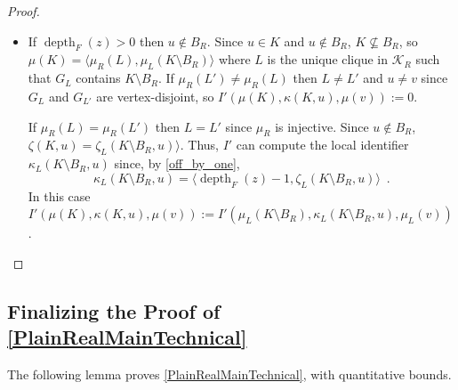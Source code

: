 \documentclass{patmorin}
\let\eqref\cref
\newcommand{\vida}[1]{\noindent{\color{pink} VD: #1}}
\newcommand{\gwen}[1]{\noindent\textcolor{Purple}{GJ: #1}}
\newcommand{\piotr}[1]{\noindent\textcolor{red}{PiMi: #1}}
\DeclareMathOperator{\depth}{depth}
\newcommand{\calK}{\mathcal{K}}
\begin{document}
\begin{proof}
\begin{itemize}
\begin{itemize}
        \item If $\depth_F(z)>0$ then $u\not\in B_R$.  Since $u\in K$ and $u\not\in B_R$, $K\not\subseteq B_R$, so $\mu(K)=\langle \mu_R(L),\mu_{L}(K\setminus B_R)\rangle$ where $L$ is the unique clique in $\calK_R$ such that $G_L$ contains $K\setminus B_R$.  If $\mu_R(L')\neq \mu_R(L)$ then $L\neq L'$ and $u\neq v$ since $G_{L}$ and $G_{L'}$ are vertex-disjoint, so $I'(\mu(K),\kappa(K,u),\mu(v)):=0$.

        If $\mu_R(L)=\mu_R(L')$ then $L=L'$ since $\mu_R$ is injective.
        Since $u\not\in B_R$,  $\zeta(K,u)=\zeta_L(K\setminus B_R,u)\rangle$.
        Thus, $I'$ can compute the local identifier $\kappa_L(K\setminus B_R,u)$ since, by \eqref{off_by_one},
        \[
           \kappa_L(K\setminus B_R,u) = \langle \depth_F(z)-1, \zeta_L(K\setminus B_R,u)\rangle\enspace.
        \]
        In this case $I'(\mu(K),\kappa(K,u),\mu(v)):=I'(\mu_L(K\setminus B_R),\kappa_L(K\setminus B_R,u),\mu_L(v))$. \qedhere
    \end{itemize}
  \end{itemize}
  \end{proof}



\subsection{Finalizing the Proof of \cref{PlainRealMainTechnical}}


The following lemma proves \cref{PlainRealMainTechnical}, with quantitative bounds.

\end{document}

